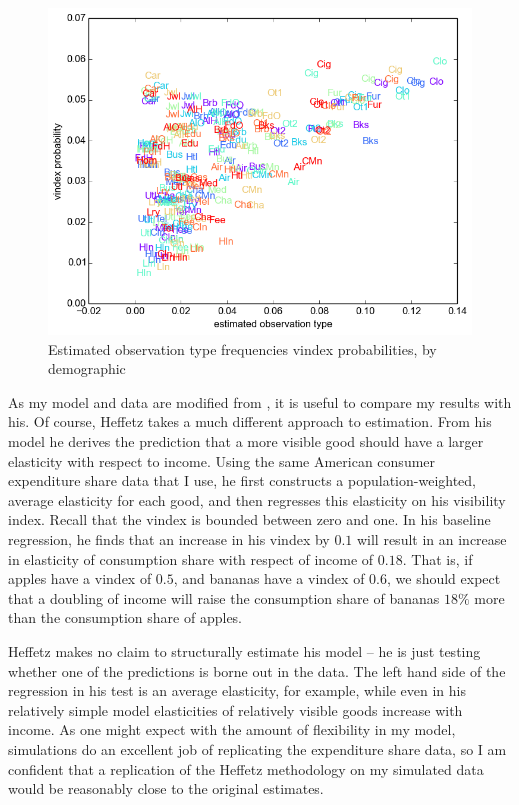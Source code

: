 \documentclass[12pt]{article}
\begin{document}
\begin{figure}
    \centering
	\includegraphics[scale=.8]{pics/obs_vin_scat.png}
    \caption{Estimated observation type frequencies vindex probabilities, by demographic}
    \label{fig:vinmatch}
\end{figure}

As my model and data are modified from \citet{heffetz2011}, it is useful to compare my results with his.  Of course, Heffetz takes a much different approach to estimation.  From his model he derives the prediction that a more visible good should have a larger elasticity with respect to income.  Using the same American consumer expenditure share data that I use, he first constructs a population-weighted, average elasticity for each good, and then regresses this elasticity on his visibility index.  Recall that the vindex is bounded between zero and one.  In his baseline regression, he finds that an increase in his vindex by $0.1$ will result in an increase in elasticity of consumption share with respect of income of $0.18$.  That is, if apples have a vindex of $0.5$, and bananas have a vindex of $0.6$, we should expect that a doubling of income will raise the consumption share of bananas $18\%$ more than the consumption share of apples.

Heffetz makes no claim to structurally estimate his model -- he is just testing whether one of the predictions is borne out in the data.  The left hand side of the regression in his test is an average elasticity, for example, while even in his relatively simple model elasticities of relatively visible goods increase with income.  As one might expect with the amount of flexibility in my model, simulations do an excellent job of replicating the expenditure share data, so I am confident that a replication of the Heffetz methodology on my simulated data would be reasonably close to the original estimates.
\end{document}
